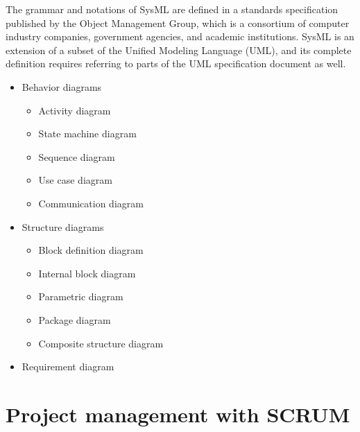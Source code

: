 The grammar and notations of SysML are defined in a standards specification published by the Object Management Group, which is a consortium of computer industry companies, government agencies, and academic institutions. SysML is an extension of a subset of the Unified Modeling Language (UML), and its complete definition requires referring to parts of the UML specification document as well.\cite{LD13}
\begin{itemize}
\item Behavior diagrams\cite{LD13}
\begin{itemize}
\item Activity diagram
\item State machine diagram
\item Sequence diagram
\item Use case diagram
\item Communication diagram
\end{itemize}
\item Structure diagrams\cite{LD13}
\begin{itemize}
\item Block definition diagram
\item Internal block diagram
\item Parametric diagram
\item Package diagram
\item Composite structure diagram
\end{itemize}
\item Requirement diagram\cite{LD13}
\end{itemize}
\vspace{1em}

\section{Project management with SCRUM }
